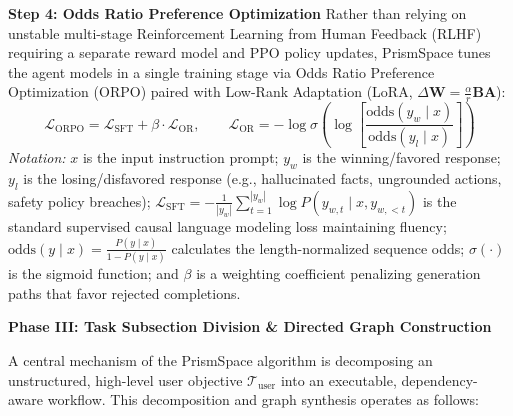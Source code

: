 \documentclass[11pt,a4paper]{article}
\begin{document}
\textbf{Step 4: Odds Ratio Preference Optimization}
Rather than relying on unstable multi-stage Reinforcement Learning from Human Feedback (RLHF) requiring a separate reward model and PPO policy updates, PrismSpace tunes the agent models in a single training stage via Odds Ratio Preference Optimization (ORPO) paired with Low-Rank Adaptation (LoRA, $\Delta \mathbf{W} = \frac{\alpha}{r} \mathbf{B}\mathbf{A}$):
\begin{equation}
\mathcal{L}_{\mathrm{ORPO}} = \mathcal{L}_{\mathrm{SFT}} + \beta \cdot \mathcal{L}_{\mathrm{OR}}, \qquad \mathcal{L}_{\mathrm{OR}} = -\log \sigma \left(\log \left[\frac{\mathrm{odds}(y_w \mid x)}{\mathrm{odds}(y_l \mid x)}\right]\right)
\end{equation}
\textit{Notation:} $x$ is the input instruction prompt; $y_w$ is the winning/favored response; $y_l$ is the losing/disfavored response (e.g., hallucinated facts, ungrounded actions, safety policy breaches); $\mathcal{L}_{\mathrm{SFT}} = -\frac{1}{|y_w|}\sum_{t=1}^{|y_w|} \log P(y_{w,t} \mid x, y_{w,<t})$ is the standard supervised causal language modeling loss maintaining fluency; $\mathrm{odds}(y \mid x) = \frac{P(y \mid x)}{1 - P(y \mid x)}$ calculates the length-normalized sequence odds; $\sigma(\cdot)$ is the sigmoid function; and $\beta$ is a weighting coefficient penalizing generation paths that favor rejected completions.

\vspace{0.18em}
\textbf{Phase III: Task Subsection Division \& Directed Graph Construction}

A central mechanism of the PrismSpace algorithm is decomposing an unstructured, high-level user objective $\mathcal{T}_{\text{user}}$ into an executable, dependency-aware workflow. This decomposition and graph synthesis operates as follows:
\end{document}
